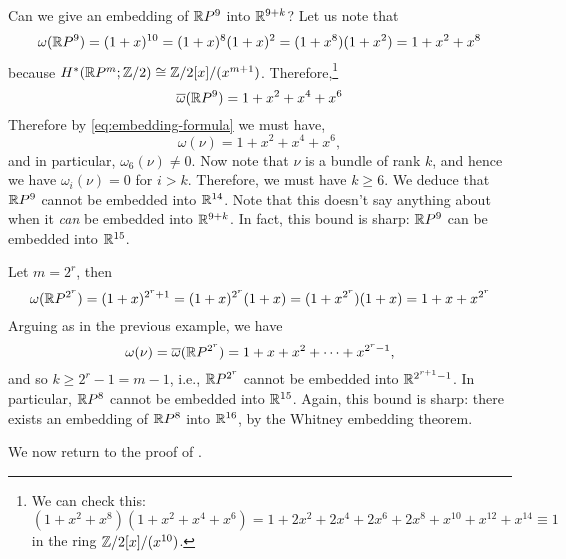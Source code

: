 \documentclass[ma3408.tex]{subfiles}
\begin{document}
\begin{Exa}
Can we give an embedding of $\mathbb{R} P^9$ into $\mathbb{R}^{9+k}$? Let us note that
\[
\omega(\mathbb{R} P^9) = (1+x)^{10} = (1+x)^8(1+x)^2 = (1+x^8)(1+x^2) = 1+x^2+x^8
\]
because $H^*(\mathbb{R} P^m;\mathbb{Z}/2) \cong \mathbb{Z}/2[x]/(x^{m+1})$. Therefore,\footnote{We can check this: $(1+x^2+x^8)(1+x^2+x^4+x^6) = 1+ 2x^2 + 2x^4 + 2x^6 +2x^8 + x^{10} +x^{12} + x^{14} \equiv 1$ in the ring $\mathbb{Z}/2[x]/(x^{10})$.}
\[
\overline{\omega}(\mathbb{R} P^9) = 1+x^2+x^4+x^6
\]
Therefore by \eqref{eq:embedding-formula} we must have,
\[
\omega(\nu) = 1 + x^2 + x^4 + x^6,
\]
and in particular, $\omega_6(\nu) \ne 0$. Now note that $\nu$ is a bundle of rank $k$, and hence we have $\omega_i(\nu) = 0$ for $i > k$. Therefore, we must have $k \ge 6$. We deduce that $\mathbb{R} P^9$ cannot be embedded into $\mathbb{R}^{14}$. Note that this doesn't say anything about when it \emph{can} be embedded into $\mathbb{R}^{9+k}$. In fact, this bound is sharp: $\mathbb{R} P^9$ can be embedded into $\mathbb{R}^{15}$.
\end{Exa}
\begin{Exa}
Let $m = 2^r$, then 
\[
\omega(\mathbb{R} P^{2^r}) = (1+x)^{2^r+1} = (1+x)^{2^r}(1+x) = (1+x^{2^r})(1+x) = 1+x+x^{2^r}
\]
Arguing as in the previous example, we have
\[
\omega(\nu) = \overline{\omega}(\mathbb{R} P^{2^r}) = 1+x+x^2 + \cdots + x^{2^r-1},
\]
and so $k \ge 2^r-1  = m-1$, i.e., $\mathbb{R} P^{2^r}$ cannot be embedded into $\mathbb{R}^{2^{r+1}-1}$. In particular, $\mathbb{R} P^8$ cannot be embedded into $\mathbb{R}^{15}$. Again, this bound is sharp: there exists an embedding of $\mathbb{R} P^8$ into $\mathbb{R}^{16}$, by the Whitney embedding theorem. 
\end{Exa}
We now return to the proof of .
\end{document}
